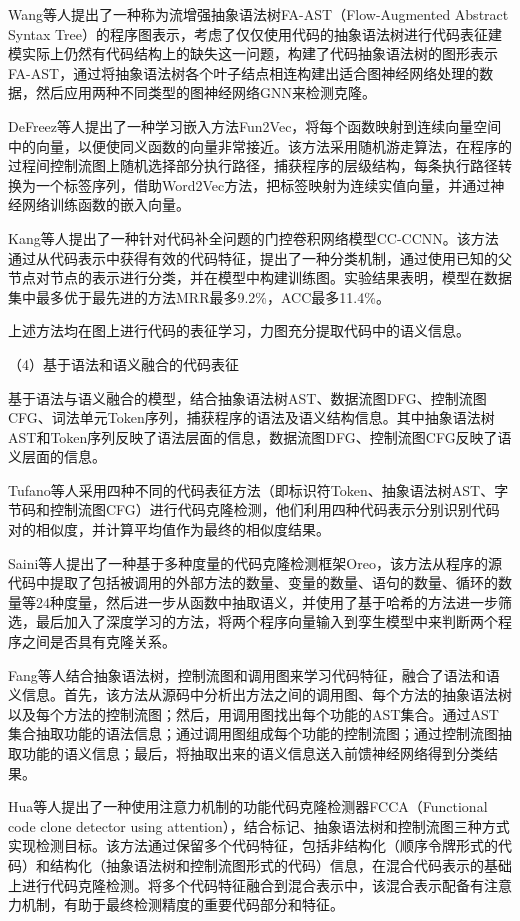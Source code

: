 Wang等人\cite{9054857}提出了一种称为流增强抽象语法树FA-AST（Flow-Augmented Abstract Syntax Tree）的程序图表示，考虑了仅仅使用代码的抽象语法树进行代码表征建模实际上仍然有代码结构上的缺失这一问题，构建了代码抽象语法树的图形表示FA-AST，通过将抽象语法树各个叶子结点相连构建出适合图神经网络处理的数据，然后应用两种不同类型的图神经网络GNN来检测克隆。

DeFreez等人\cite{10.1145/3236024.3236059}提出了一种学习嵌入方法Fun2Vec，将每个函数映射到连续向量空间中的向量，以便使同义函数的向量非常接近。该方法采用随机游走算法，在程序的过程间控制流图上随机选择部分执行路径，捕获程序的层级结构，每条执行路径转换为一个标签序列，借助Word2Vec方法，把标签映射为连续实值向量，并通过神经网络训练函数的嵌入向量。

Kang等人\cite{Yang2021AGS}提出了一种针对代码补全问题的门控卷积网络模型CC-CCNN。该方法通过从代码表示中获得有效的代码特征，提出了一种分类机制，通过使用已知的父节点对节点的表示进行分类，并在模型中构建训练图。实验结果表明，模型在数据集中最多优于最先进的方法MRR最多9.2\%，ACC最多11.4\%。

上述方法均在图上进行代码的表征学习，力图充分提取代码中的语义信息。

（4）基于语法和语义融合的代码表征

基于语法与语义融合的模型，结合抽象语法树AST、数据流图DFG、控制流图CFG、词法单元Token序列，捕获程序的语法及语义结构信息。其中抽象语法树AST和Token序列反映了语法层面的信息，数据流图DFG、控制流图CFG反映了语义层面的信息。

Tufano等人\cite{Tufano2018DeepLS}采用四种不同的代码表征方法（即标识符Token、抽象语法树AST、字节码和控制流图CFG）进行代码克隆检测，他们利用四种代码表示分别识别代码对的相似度，并计算平均值作为最终的相似度结果。

Saini等人\cite{10.1145/3236024.3236026}提出了一种基于多种度量的代码克隆检测框架Oreo，该方法从程序的源代码中提取了包括被调用的外部方法的数量、变量的数量、语句的数量、循环的数量等24种度量，然后进一步从函数中抽取语义，并使用了基于哈希的方法进一步筛选，最后加入了深度学习的方法，将两个程序向量输入到孪生模型中来判断两个程序之间是否具有克隆关系。

Fang等人\cite{Fang2020FunctionalCC}结合抽象语法树，控制流图和调用图来学习代码特征，融合了语法和语义信息。首先，该方法从源码中分析出方法之间的调用图、每个方法的抽象语法树以及每个方法的控制流图；然后，用调用图找出每个功能的AST集合。通过AST集合抽取功能的语法信息；通过调用图组成每个功能的控制流图；通过控制流图抽取功能的语义信息；最后，将抽取出来的语义信息送入前馈神经网络得到分类结果。

Hua等人\cite{Hua2020FCCAHC}提出了一种使用注意力机制的功能代码克隆检测器FCCA（Functional code clone detector using attention），结合标记、抽象语法树和控制流图三种方式实现检测目标。该方法通过保留多个代码特征，包括非结构化（顺序令牌形式的代码）和结构化（抽象语法树和控制流图形式的代码）信息，在混合代码表示的基础上进行代码克隆检测。将多个代码特征融合到混合表示中，该混合表示配备有注意力机制，有助于最终检测精度的重要代码部分和特征。

